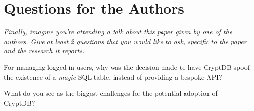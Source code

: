 \documentclass[11pt]{article}
\begin{document}
\section*{Questions for the Authors}

\textsl{Finally, imagine you're attending a talk about this paper given by one
of the authors. Give at least 2 questions that you would like to ask, specific
to the paper and the research it reports.}

For managing logged-in users, why was the decision made to have CryptDB spoof
the existence of a \textit{magic} SQL table, instead of providing a bespoke
API?

What do you see as the biggest challenges for the potential adoption of
CryptDB?




\end{document}
